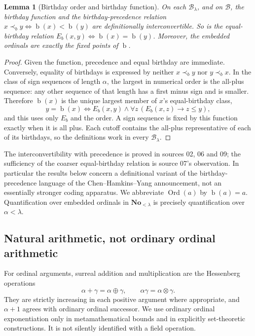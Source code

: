 \documentclass[11pt,letterpaper]{article}
\newtheorem{lemma}[lemma]{Lemma}\aliascntresetthe{lemma}
\theoremstyle{definition}
\theoremstyle{remark}
\newcommand{\No}{\mathbf{No}}
\newcommand{\Ord}{\operatorname{Ord}}
\newcommand{\bd}{\operatorname{b}}
\newcommand{\B}{\mathcal B}
\newcommand{\nsum}{\mathbin{\oplus}}
\newcommand{\nprod}{\mathbin{\otimes}}
\begin{document}
\begin{lemma}[Birthday order and birthday function]
\label{hset:lem:birthday-language}
On each $\B_\lambda$, and on $\B$, the birthday function and the
birthday-precedence relation $x\prec_b y\iff\bd(x)<\bd(y)$ are definitionally
interconvertible. So is the equal-birthday relation
$E_b(x,y)\iff\bd(x)=\bd(y)$. Moreover, the embedded ordinals are exactly the
fixed points of $\bd$.
\end{lemma}
\begin{proof}
Given the function, precedence and equal birthday are immediate. Conversely,
equality of birthdays is expressed by neither $x\prec_b y$ nor $y\prec_b x$. In
the class of sign sequences of length $\alpha$, the largest in numerical order
is the all-plus sequence: any other sequence of that length has a first minus
sign and is smaller. Therefore $\bd(x)$ is the unique largest member of $x$'s
equal-birthday class,
\[
 y=\bd(x)\iff E_b(x,y)\land\forall z\,(E_b(x,z)\to z\le y),
\]
and this uses only $E_b$ and the order. A sign sequence is fixed by this
function exactly when it is all plus. Each cutoff contains the all-plus
representative of each of its birthdays, so the definitions work in every
$\B_\lambda$.
\end{proof}

The interconvertibility with precedence is proved in sources 02, 06 and 09;
the sufficiency of the coarser equal-birthday relation is source 07's
observation. In particular the results below concern a definitional variant of
the birthday-precedence language of the Chen--Hamkins--Yang announcement, not
an essentially stronger coding apparatus. We abbreviate $\Ord(a)$ by
$\bd(a)=a$. Quantification over embedded ordinals in $\No_{<\lambda}$ is
precisely quantification over $\alpha<\lambda$.

\subsection{Natural arithmetic, not ordinary ordinal arithmetic}

For ordinal arguments, surreal addition and multiplication are the
Hessenberg operations
\[
 \alpha+\gamma=\alpha\nsum\gamma,\qquad
 \alpha\gamma=\alpha\nprod\gamma.
\]
They are strictly increasing in each positive argument where appropriate,
and $\alpha+1$ agrees with ordinary ordinal successor. We use ordinary
ordinal exponentiation only in metamathematical bounds and in explicitly
set-theoretic constructions. It is not silently identified with a field
operation.
\end{document}
